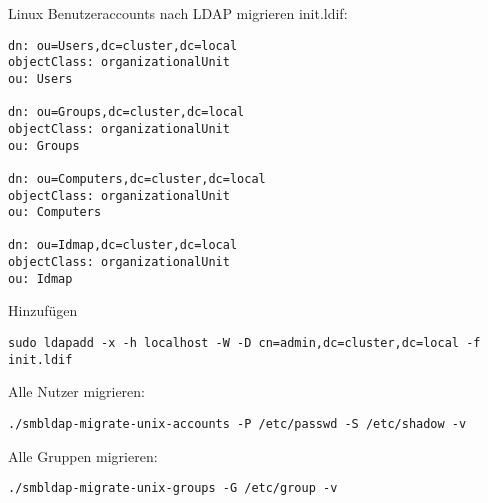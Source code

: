 Linux Benutzeraccounts nach LDAP migrieren
init.ldif:
\begin{lstlisting}[style=Bash]
dn: ou=Users,dc=cluster,dc=local
objectClass: organizationalUnit
ou: Users

dn: ou=Groups,dc=cluster,dc=local
objectClass: organizationalUnit
ou: Groups

dn: ou=Computers,dc=cluster,dc=local
objectClass: organizationalUnit
ou: Computers

dn: ou=Idmap,dc=cluster,dc=local
objectClass: organizationalUnit
ou: Idmap
\end{lstlisting}
Hinzufügen
\begin{lstlisting}[style=Bash]
sudo ldapadd -x -h localhost -W -D cn=admin,dc=cluster,dc=local -f init.ldif
\end{lstlisting}
Alle Nutzer migrieren:
\begin{lstlisting}[style=Bash]
./smbldap-migrate-unix-accounts -P /etc/passwd -S /etc/shadow -v
\end{lstlisting}
Alle Gruppen migrieren:
\begin{lstlisting}[style=Bash]
./smbldap-migrate-unix-groups -G /etc/group -v 
\end{lstlisting}
